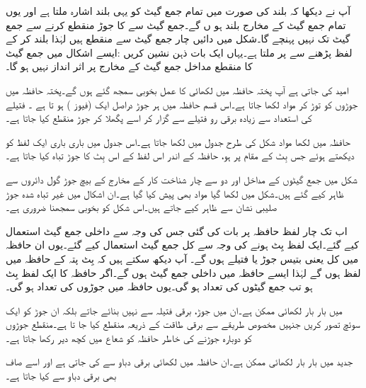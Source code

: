 آپ نے دیکھا کہ    بلند  کی صورت میں تمام جمع گیٹ کو یہی بلند اشارہ ملتا ہے اور یوں تمام جمع گیٹ کے مخارج بلند ہو ں گے۔جمع گیٹ سے    کا جوڑ منقطع  کرنے سے     جمع گیٹ تک نہیں  پہنچے  گا۔شکل  میں دائیں چار جمع گیٹ  سے منقطع  ہیں لہٰذا  بلند کر کے لفظ  پڑھنے سے    پر  ملتا ہے۔یہاں ایک بات ذہن  نشین کریں :ایسے اشکال میں  جمع گیٹ کا منقطع مداخل جمع گیٹ کے مخارج پر اثر  انداز نہیں ہو گا۔

امید کی جاتی ہے آپ پختہ حافظہ میں لکھائی کا عمل بخوبی سمجھ گئے ہوں گے۔پختہ حافظہ میں  جوڑوں کو توڑ کر مواد لکھا جاتا ہے۔اس قسم حافظہ میں ہر جوڑ دراصل ایک (فیوز  ) ہو تا ہے ۔ فتیلے  کی استعداد  سے زیادہ برقی رو  فتیلے سے گزار کر اسے پگھلا کر  جوڑ   منقطع  کیا   جاتا ہے۔


حافظہ میں  لکھا  مواد شکل کی طرح جدول میں لکھا جاتا ہے۔اس جدول میں    باری باری ایک لفظ کو  دیکھتے ہوئے جس بِٹ کے مقام پر  ہو،  حافظہ کے اندر اس لفظ کے اس بِٹ کا جوڑ تباہ کیا جاتا ہے۔


شکل  میں  جمع گیٹوں کے مداخل اور دو سے چار شناخت کار کے مخارج کے  بیچ جوڑ گول دائروں سے  ظاہر کیے  گئے ہیں۔شکل  میں لکھا گیا مواد   بھی   پیش کیا گیا ہے۔ان  اشکال میں غیر تباہ شدہ جوڑ  صلیبی نشان   سے ظاہر کیے  جاتے ہیں۔اس شکل کو بخوبی سمجھنا  ضروری ہے۔

اب تک  چار لفظ  حافظہ  پر بات کی گئی جس کی وجہ سے   داخلی جمع گیٹ استعمال کیے گئے۔ایک لفظ   بِٹ ہونے کی وجہ سے کل   جمع گیٹ استعمال کیے گئے۔یوں  ان حافظہ میں کل  یعنی  بتیس    جوڑ یا  فتیلے  ہوں گے۔ آپ دیکھ سکتے ہیں کہ  بِٹ پتہ   کے حافظہ میں   لفظ ہوں گے لہٰذا ایسے حافظہ میں   داخلی جمع گیٹ  ہوں گے۔اگر حافظہ کا ایک لفظ  بِٹ ہو تب جمع گیٹوں کی تعداد  ہو گی۔یوں حافظہ میں جوڑوں کی تعداد   ہو گی۔

 میں بار بار لکھائی ممکن ہے۔ان  میں   جوڑ، برقی فتیلہ سے نہیں بنائے جاتے بلکہ ان   جوڑ کو ایک سوئچ  تصور  کریں جنہیں مخصوص طریقے سے برقی طاقت کے ذریعہ منقطع کیا جا تا ہے۔منقطع جوڑوں کو دوبارہ جوڑنے کی خاطر حافظہ کو شعاع  میں کچھ دیر رکھا جاتا ہے۔

جدید میں  بار بار لکھائی ممکن ہے۔ان حافظہ میں لکھائی برقی دباو سے کی جاتی ہے اور اسے صاف بھی برقی دباو سے  کیا جاتا ہے۔

